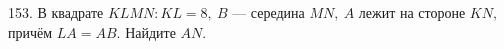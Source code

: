 153. В квадрате $KLMN: KL=8,\ B$ --- середина $MN,\ A$ лежит на стороне $KN,$ причём $LA=AB.$ Найдите $AN.$\\
